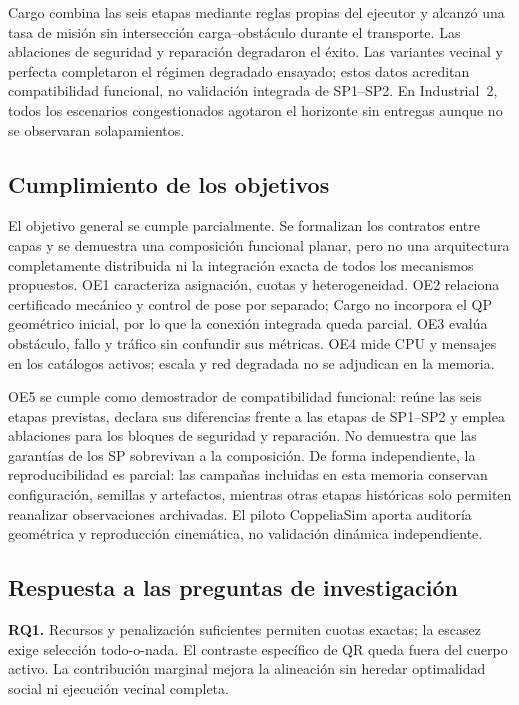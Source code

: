 Cargo combina las seis etapas mediante reglas propias del ejecutor y alcanzó
una tasa de misión \CargoEtwoESuccess{} sin intersección carga--obstáculo durante
el transporte. Las ablaciones de seguridad y reparación degradaron el éxito.
Las variantes vecinal y perfecta completaron el régimen degradado ensayado;
estos datos acreditan compatibilidad funcional, no validación integrada de
SP1--SP2. En Industrial~2, todos los escenarios congestionados agotaron el
horizonte sin entregas aunque no se observaran solapamientos.

\subsection{Cumplimiento de los objetivos}

El objetivo general se cumple parcialmente. Se formalizan los contratos entre
capas y se demuestra una composición funcional planar, pero no una arquitectura
completamente distribuida ni la integración exacta de todos los mecanismos
propuestos. OE1 caracteriza asignación, cuotas y heterogeneidad. OE2 relaciona
certificado mecánico y control de pose por separado; Cargo no incorpora el QP
geométrico inicial, por lo que la conexión integrada queda parcial. OE3 evalúa
obstáculo, fallo y tráfico sin confundir sus métricas. OE4 mide CPU y mensajes
en los catálogos activos; escala y red degradada no se adjudican en la memoria.

OE5 se cumple como demostrador de compatibilidad funcional: reúne las seis
etapas previstas, declara sus diferencias frente a las etapas de SP1--SP2 y emplea ablaciones
para los bloques de seguridad y reparación. No demuestra que las garantías de
los SP sobrevivan a la composición. De forma independiente, la reproducibilidad
es parcial: las campañas incluidas en esta memoria conservan configuración,
semillas y artefactos, mientras otras etapas históricas solo permiten reanalizar
observaciones archivadas. El piloto CoppeliaSim aporta auditoría geométrica y
reproducción cinemática, no validación dinámica independiente.

\subsection{Respuesta a las preguntas de investigación}

\textbf{RQ1.} Recursos y penalización suficientes permiten cuotas exactas;
la escasez exige selección todo-o-nada. El contraste específico de QR queda
fuera del cuerpo activo. La contribución marginal mejora la alineación sin
heredar optimalidad social ni ejecución vecinal completa.

